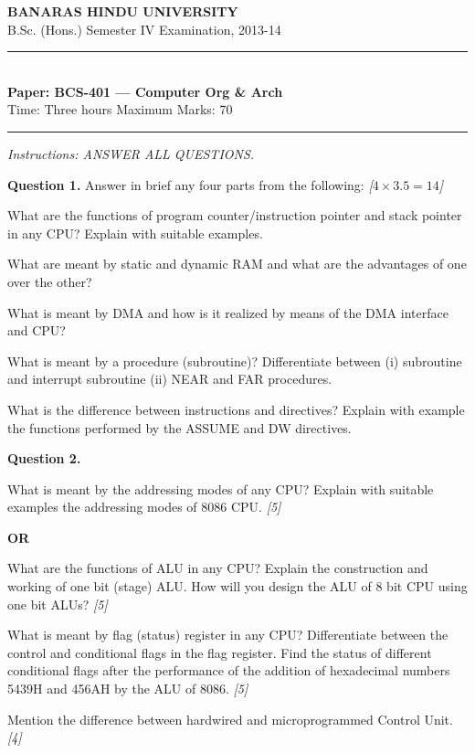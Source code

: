\documentclass[11pt,a4paper]{article}
\newcommand{\pts}[1]{\hfill   \textit{[#1]}}
\begin{document}
\begin{center}
  {\large\bfseries BANARAS HINDU UNIVERSITY}\\[2pt]
  {\normalsize B.Sc. (Hons.) Semester IV Examination, 2013-14}\\[6pt]
  \rule{0.8\linewidth}{0.5pt}\\[6pt]
  {\large\bfseries Paper: BCS-401 --- Computer Org \& Arch}\\[4pt]
  {\normalsize Time: Three hours \hfill Maximum Marks: 70}
\end{center}

\rule{\linewidth}{0.4pt}

\smallskip



\noindent   \textit{Instructions: ANSWER ALL QUESTIONS.}

\bigskip

\medskip


\noindent   \textbf{Question 1.} Answer in brief any four parts from the following: \pts{$4  \times 3.5 = 14$}

\begin{parts}
  \item What are the functions of program counter/instruction pointer and stack pointer in any CPU? Explain with suitable examples.
  \item What are meant by static and dynamic RAM and what are the advantages of one over the other?
  \item What is meant by DMA and how is it realized by means of the DMA interface and CPU?
  \item What is meant by a procedure (subroutine)? Differentiate between (i) subroutine and interrupt subroutine (ii) NEAR and FAR procedures.
  \item What is the difference between instructions and directives? Explain with example the functions performed by the ASSUME and DW directives.
\end{parts}

\medskip


\noindent   \textbf{Question 2.}

\begin{parts}
  \item What is meant by the addressing modes of any CPU? Explain with suitable examples the addressing modes of 8086 CPU. \pts{5}
  \centerline{   \textbf{OR}}
  What are the functions of ALU in any CPU? Explain the construction and working of one bit (stage) ALU. How will you design the ALU of 8 bit CPU using one bit ALUs? \pts{5}
  \item What is meant by flag (status) register in any CPU? Differentiate between the control and conditional flags in the flag register. Find the status of different conditional flags after the performance of the addition of hexadecimal numbers 5439H and 456AH by the ALU of 8086. \pts{5}
  \item Mention the difference between hardwired and microprogrammed Control Unit. \pts{4}
\end{parts}
\end{document}
